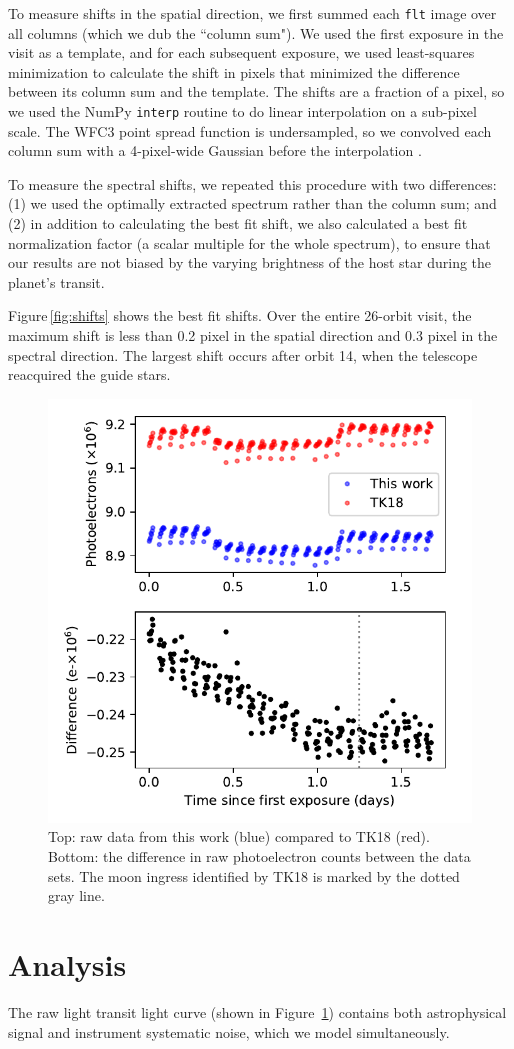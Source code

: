 \documentclass[twocolumn]{aastex62}
\begin{document}
To measure shifts in the spatial direction, we first summed each \texttt{flt} image over all columns (which we dub the ``column sum"). We used the first exposure in the visit as a template, and for each subsequent exposure, we used least-squares minimization to calculate the shift in pixels that minimized the difference between its column sum and the template. The shifts are a fraction of a pixel, so we used the NumPy \texttt{interp} routine to do linear interpolation on a sub-pixel scale. The WFC3 point spread function is undersampled, so we convolved each column sum with a 4-pixel-wide Gaussian  before the interpolation \citep[following][]{deming13}.  

To measure the spectral shifts, we repeated this procedure with two differences: (1) we used the optimally extracted spectrum rather than the column sum; and (2) in addition to calculating the best fit shift, we also calculated a best fit normalization factor (a scalar multiple for the whole spectrum), to ensure that our results are not biased by the varying brightness of the host star during the planet's transit. 

Figure\,\ref{fig:shifts} shows the best fit shifts. Over the entire 26-orbit visit, the maximum shift is less than 0.2 pixel in the spatial direction and 0.3 pixel in the spectral direction. The largest shift occurs after orbit 14, when the telescope reacquired the guide stars. 

\begin{figure}
\includegraphics[width = 0.5 \textwidth]{figures/fig6_rawdata.pdf}
    \caption{Top: raw data from this work (blue) compared to TK18 (red). Bottom: the difference in raw photoelectron counts between the data sets. The moon ingress identified by TK18 is marked by the dotted gray line.}
\label{fig:raw}
\end{figure}

\section{Analysis}
The raw light transit light curve (shown in Figure~\ref{fig:raw}) contains both astrophysical signal and instrument systematic noise, which we model simultaneously. 
\end{document}
